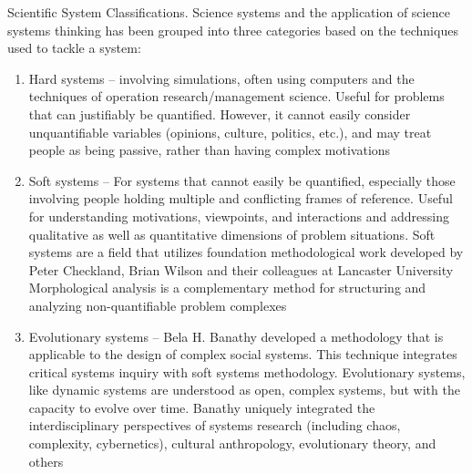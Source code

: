 Scientific System Classifications. Science systems and the application of science systems thinking has been grouped into three categories based on the techniques used to tackle a system:
\begin{enumerate}
\item Hard systems – involving simulations, often using computers and the techniques of operation research/management science. Useful for problems that can justifiably be quantified. However, it cannot easily consider unquantifiable variables (opinions, culture, politics, etc.), and may treat people as being passive, rather than having complex motivations
\item Soft systems – For systems that cannot easily be quantified, especially those involving people holding multiple and conflicting frames of reference. Useful for understanding motivations, viewpoints, and interactions and addressing qualitative as well as quantitative dimensions of problem situations. Soft systems are a field that utilizes foundation methodological work developed by Peter Checkland, Brian Wilson and their colleagues at Lancaster University Morphological analysis is a complementary method for structuring and analyzing non-quantifiable problem complexes
\item Evolutionary systems – Bela H. Banathy developed a methodology that is applicable to the design of complex social systems. This technique integrates critical systems inquiry with soft systems methodology. Evolutionary systems, like dynamic systems are understood as open, complex systems, but with the capacity to evolve over time. Banathy uniquely integrated the interdisciplinary perspectives of systems research (including chaos, complexity, cybernetics), cultural anthropology, evolutionary theory, and others
\end{enumerate}

